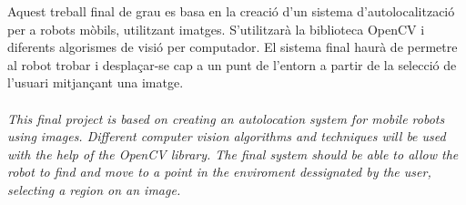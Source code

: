 	Aquest treball final de grau es basa en la creació d'un sistema d'autolocalització per a robots mòbils, utilitzant imatges. S'utilitzarà la biblioteca OpenCV i diferents algorismes de visió per computador.
	El sistema final haurà de permetre al robot trobar i desplaçar-se cap a un punt de l'entorn a partir de la selecció de l'usuari mitjançant una imatge.\\\\
	\textit{This final project is based on creating an autolocation system for mobile robots using images. Different computer vision algorithms and techniques will be used with the help of
	the OpenCV library. The final system should be able to allow the robot to find and move to a point in the enviroment dessignated by the user, selecting a region on an image.}
